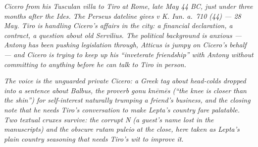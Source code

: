 
\textit{Cicero from his Tusculan villa to Tiro at Rome, late May
44 BC, just under three months after the Ides. The Perseus
dateline gives \textit{v K. Iun. a.~710 (44)} --- 28 May. Tiro is
handling Cicero's affairs in the city: a financial declaration, a
contract, a question about old Servilius. The political
background is anxious --- Antony has been pushing legislation
through, Atticus is jumpy on Cicero's behalf --- and Cicero is
trying to keep up his ``inveterate friendship'' with Antony
without committing to anything before he can talk to Tiro in
person.}

\textit{The voice is the unguarded private Cicero: a Greek tag
about head-colds dropped into a sentence about Balbus, the proverb
\textit{gonu kn\=em\=es} (``the knee is closer than the shin'') for
self-interest naturally trumping a friend's business, and the
closing note that he needs Tiro's conversation to make Lepta's
country fare palatable. Two textual cruxes survive: the corrupt
\dag N (a guest's name lost in the manuscripts) and the obscure
\textit{rutam puleio} at the close, here taken as Lepta's plain
country seasoning that needs Tiro's wit to improve it.}
